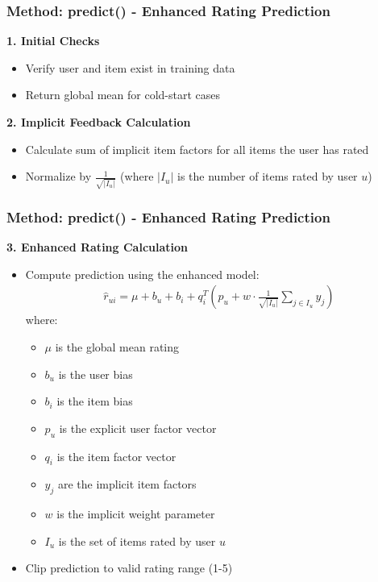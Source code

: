\documentclass{beamer}
\begin{document}
\begin{frame}
\frametitle{Method: predict() - Enhanced Rating Prediction}
    \textbf{1. Initial Checks}
    \begin{itemize}
        \item Verify user and item exist in training data
        \item Return global mean for cold-start cases
    \end{itemize}
    
    \textbf{2. Implicit Feedback Calculation}
    \begin{itemize}
        \item Calculate sum of implicit item factors for all items the user has rated
        \item Normalize by $\frac{1}{\sqrt{|I_u|}}$ (where $|I_u|$ is the number of items rated by user $u$)
    \end{itemize}
\end{frame}

\begin{frame}
\frametitle{Method: predict() - Enhanced Rating Prediction}
    \textbf{3. Enhanced Rating Calculation}
    \begin{itemize}
        \item Compute prediction using the enhanced model:
        \begin{align*}
        \hat{r}_{ui} = \mu + b_u + b_i + q_i^T \left(p_u + w \cdot \frac{1}{\sqrt{|I_u|}} \sum_{j \in I_u} y_j\right)
        \end{align*}
        where:
        \begin{itemize}
            \item $\mu$ is the global mean rating
            \item $b_u$ is the user bias
            \item $b_i$ is the item bias
            \item $p_u$ is the explicit user factor vector
            \item $q_i$ is the item factor vector
            \item $y_j$ are the implicit item factors
            \item $w$ is the implicit weight parameter
            \item $I_u$ is the set of items rated by user $u$
        \end{itemize}
        \item Clip prediction to valid rating range (1-5)
    \end{itemize}
\end{frame}
\end{document}
